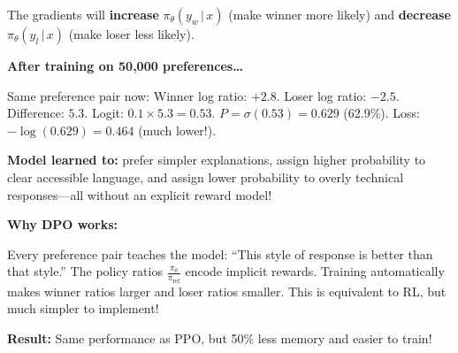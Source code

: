 \begin{chapterenv}
The gradients will \textbf{increase} $\pi_\theta(y_w \,|\, x)$ (make winner more likely) and \textbf{decrease} $\pi_\theta(y_l \,|\, x)$ (make loser less likely).

\textbf{After training on 50,000 preferences\ldots}

Same preference pair now: Winner log ratio: $+2.8$. Loser log ratio: $-2.5$. Difference: $5.3$. Logit: $0.1 \times 5.3 = 0.53$. $P = \sigma(0.53) = 0.629$ (62.9\%). Loss: $-\log(0.629) = 0.464$ (much lower!).

\textbf{Model learned to:} prefer simpler explanations, assign higher probability to clear accessible language, and assign lower probability to overly technical responses---all without an explicit reward model!

\begin{infobox}
\textbf{Why DPO works:}

Every preference pair teaches the model: ``This style of response is better than that style.'' The policy ratios $\frac{\pi_\theta}{\pi_{\text{ref}}}$ encode implicit rewards. Training automatically makes winner ratios larger and loser ratios smaller. This is equivalent to RL, but much simpler to implement!

\textbf{Result:} Same performance as PPO, but 50\% less memory and easier to train!
\end{infobox}

\end{chapterenv}